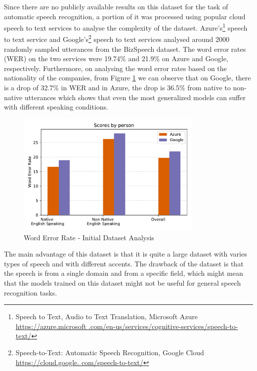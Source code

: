 Since there are no publicly available results on this dataset for the task of automatic speech recognition, a portion of it was processed using popular cloud speech to text services to analyse the complexity of the dataset. Azure's\footnote{Speech to Text, Audio to Text Translation, Microsoft Azure \href{https://azure.microsoft.com/en-us/services/cognitive-services/speech-to-text/}{https://azure.microsoft .com/en-us/services/cognitive-services/speech-to-text/}} speech to text service and Google's\footnote{Speech-to-Text: Automatic Speech Recognition, Google Cloud \href{https://cloud.google.com/speech-to-text/}{https://cloud.google. com/speech-to-text/}} speech to text services analysed around 2000 randomly sampled utterances from the BizSpeech dataset. The word error rates (WER) on the two services were 19.74\% and 21.9\% on Azure and Google, respectively. Furthermore, on analysing the word error rates based on the nationality of the companies, from Figure \ref{fig:wer_cloud} we can observe that on Google, there is a drop of 32.7\% in WER and in Azure, the drop is 36.5\% from native to non-native utterances which shows that even the most generalized models can suffer with different speaking conditions. 

\begin{figure}[ht]
  \begin{center}
    \includegraphics[width=0.8\textwidth]{images/wer_cloud.pdf} 
    \caption{Word Error Rate - Initial Dataset Analysis}
    \label{fig:wer_cloud}
  \end{center}
\end{figure}


The main advantage of this dataset is that it is quite a large dataset with varies types of speech and with different accents. The drawback of the dataset is that the speech is from a single domain and from a specific field, which might mean that the models trained on this dataset might not be useful for general speech recognition tasks.

